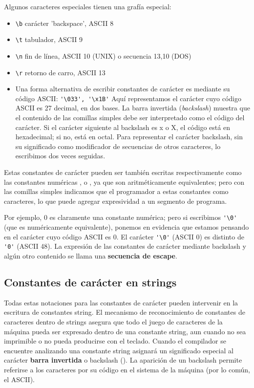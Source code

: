 Algunos caracteres especiales tienen una grafía especial:
\begin{itemize}
	\item \lstinline{\b} carácter 'backspace', ASCII 8
\item \lstinline{\t} tabulador, ASCII 9
\item \lstinline{\n} fin de línea, ASCII 10 (UNIX) o secuencia 13,10 (DOS)
\item \lstinline{\r} retorno de carro, ASCII 13
\item Una forma alternativa de escribir constantes de carácter es mediante su código ASCII:
\lstinline{'\033', '\x1B'}
Aquí representamos el carácter cuyo código ASCII es 27 decimal, en dos bases. La barra invertida
(\textit{backslash}) muestra que el contenido de las comillas simples debe ser interpretado como el código del
carácter. Si el carácter siguiente al backslash es x o X, el código está en hexadecimal; si no, está en
octal. Para representar el carácter backslash, sin su significado como modificador de secuencias de
otros caracteres, lo escribimos dos veces seguidas.
\end{itemize}


Estas constantes de carácter pueden ser también escritas respectivamente como las constantes
numéricas ,  o , ya que son aritméticamente equivalentes; pero con las comillas simples
indicamos que el programador  a estas constantes como caracteres, lo que puede agregar
expresividad a un segmento de programa.

Por ejemplo, 0 es claramente una constante numérica; pero si escribimos \lstinline{'\0'} (que es numéricamente
equivalente), ponemos en evidencia que estamos pensando en el carácter cuyo código ASCII es 0. El carácter
\lstinline{'\0'} (ASCII 0) es distinto de \lstinline{'0'} (ASCII 48). La expresión de las constantes de carácter mediante
backslash y algún otro contenido se llama una \textbf{secuencia de escape}.




\subsection{Constantes de carácter en strings}
Todas estas notaciones para las constantes de carácter pueden intervenir en la escritura de constantes
string. El mecanismo de reconocimiento de constantes de caracteres dentro de strings asegura que todo el
juego de caracteres de la máquina pueda ser expresado dentro de una constante string, aun cuando no
sea imprimible o no pueda producirse con el teclado. Cuando el compilador se encuentre analizando
una constante string asignará un significado especial al carácter \textbf{barra invertida} o backslash (\code{\\}). La
aparición de un backslash permite referirse a los caracteres por su código en el sistema de la máquina
(por lo común, el ASCII).

